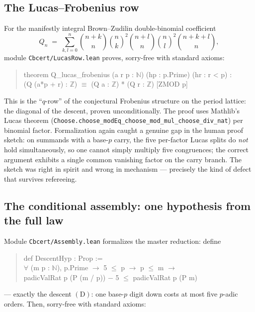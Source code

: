 \documentclass[11pt]{article}
\theoremstyle{definition}
\newcommand{\Z}{\mathbb{Z}}
\newcommand{\bin}[2]{\binom{#1}{#2}}
\newcommand{\lean}[1]{\texttt{#1}}
\begin{document}
\subsection*{The Lucas--Frobenius row}

For the manifestly integral Brown--Zudilin double-binomial coefficient
\[
Q_n \;=\; \sum_{k,l=0}^{n} \bin{n+k}{n}\bin nk^2 \bin{n+l}{n}\bin nl^2
\bin{n+k+l}{n},
\]
module \lean{Cbcert/LucasRow.lean} proves, sorry-free with standard axioms:

\begin{quote}\small\ttfamily
theorem Q\_lucas\_frobenius (a r p : $\mathbb N$) (hp : p.Prime) (hr : r < p) :\\
\hspace*{1em}(Q (a*p + r) : $\Z$) $\equiv$ (Q a : $\Z$) * (Q r : $\Z$) [ZMOD p]
\end{quote}

\noindent
This is the ``$q$-row'' of the conjectural Frobenius structure on the period
lattice: the diagonal of the descent, proven unconditionally. The proof uses
Mathlib's Lucas theorem
(\lean{Choose.choose\_modEq\_choose\_mod\_mul\_choose\_div\_nat}) per binomial
factor. Formalization again caught a genuine gap in the human proof sketch:
on summands with a base-$p$ carry, the five per-factor Lucas splits do
\emph{not} hold simultaneously, so one cannot simply multiply five
congruences; the correct argument exhibits a single common vanishing factor
on the carry branch. The sketch was right in spirit and wrong in mechanism
--- precisely the kind of defect that survives refereeing.

\subsection*{The conditional assembly: one hypothesis from the full law}

Module \lean{Cbcert/Assembly.lean} formalizes the master reduction: define

\begin{quote}\small\ttfamily
def DescentHyp : Prop :=\\
\hspace*{1em}$\forall$ (m p : $\mathbb N$), p.Prime $\to$ 5 $\le$ p $\to$ p $\le$ m $\to$\\
\hspace*{2em}padicValRat p (P (m / p)) $-$ 5 $\le$ padicValRat p (P m)
\end{quote}

\noindent
--- exactly the descent $(\mathrm D)$: one base-$p$ digit down costs at most
five $p$-adic orders. Then, sorry-free with standard axioms:
\end{document}
